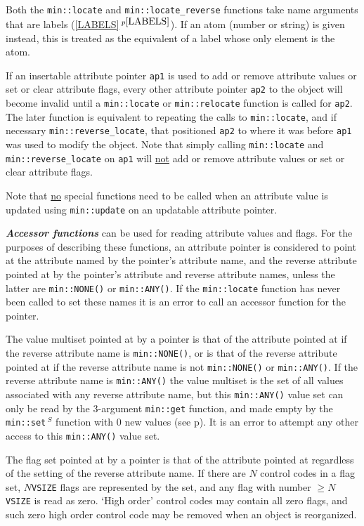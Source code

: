 \documentclass[12pt]{article}
\newcommand{\ikey}[2]{{\bf \em #1}\index{#2}}
\newcommand{\itemref}[1]{\ref{#1}$\,^{p\pageref{#1}}$}
\newcommand{\pagref}[1]{p\pageref{#1}}
\newcommand{\EOL}{\penalty \exhyphenpenalty}
\newcommand{\RESIZE}{$\,^S$}
\begin{document}
Both the {\tt min::\EOL locate} and {\tt min::\EOL locate\_reverse}
functions take name
arguments that are labels (\itemref{LABELS}).  If an atom (number or
string) is given instead, this is treated as the equivalent of
a label whose only element is the atom.

If an insertable attribute pointer {\tt ap1} is used
to add or remove attribute values or set or clear attribute flags,
every other attribute pointer {\tt ap2}
to the object will become invalid until a {\tt min::\EOL locate} or
{\tt min::\EOL relocate} function is called for {\tt ap2}.  The later
function is equivalent to repeating the calls to {\tt min::\EOL locate},
and if necessary {\tt min::\EOL reverse\_\EOL locate}, that positioned
{\tt ap2} to where it was before {\tt ap1} was used to modify the object.
Note that simply calling {\tt min::\EOL locate}
and {\tt min::\EOL reverse\_\EOL locate} on {\tt ap1} will
\underline{not} add or remove attribute values or set or clear attribute flags.

Note that \underline{no} special functions need to be called when an attribute
value is updated using {\tt min::\EOL update} on
an updatable attribute pointer.

\ikey{Accessor functions}{accessor function}
can be used for reading attribute values and flags.
For the purposes of describing these functions,
an attribute pointer is considered to point at the attribute
named by the pointer's attribute name, and the reverse attribute
pointed at by the pointer's attribute and reverse attribute names,
unless the latter are \verb|min::NONE()| or \verb|min::ANY()|.
If the {\tt min::\EOL locate} function has never been called to set
these names it is an error to call an accessor
function for the pointer.

The value multiset pointed at by a pointer is that of the attribute pointed
at if the reverse attribute name is \verb|min::NONE()|, or is that of
the reverse attribute pointed at if the reverse attribute name is not
\verb|min::NONE()| or \verb|min::ANY()|.
If the reverse attribute name is \verb|min::ANY()| the value multiset is
the set of all values associated with any reverse attribute name, but
this \verb|min::ANY()|
value set can only be read by the 3-argument \verb|min::get|
function, and made empty by the {\tt min::\EOL set\RESIZE}
function with 0 new values (see \pagref{MIN::SET_DELETE_ANY}).
It is an error to attempt any other access to this \verb|min::ANY()| value set.

The flag set pointed at by a pointer is that of the attribute pointed
at regardless of the setting of the reverse attribute name.
If there are $N$ control codes in a flag set, $N${\tt *VSIZE} flags are
represented by the set, and any flag with number $\geq N${\tt *VSIZE} is
read as zero.  `High order' control codes may contain all zero flags,
and such zero high order control code may be removed when an object
is reorganized.
\end{document}
